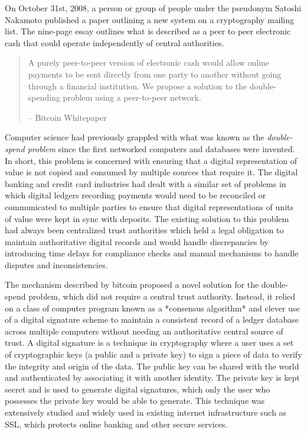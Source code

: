 On October 31st, 2008, a person or group of people under the pseudonym Satoshi
Nakamoto published \cite{nakamoto_bitcoin_2008} a paper outlining a new system on a
cryptography mailing list. The nine-page essay outlines what is described as a
peer to peer electronic cash that could operate independently of central
authorities.


\begin{quote}
A purely peer-to-peer version of electronic cash would allow online
payments to be sent directly from one party to another without going
through a financial institution. We propose a solution to the
double-spending problem using a peer-to-peer network.
\begin{flushright}
-- Bitcoin Whitepaper
\end{flushright}
\end{quote}

Computer science had previously grappled with what was known as the
\textit{double-spend problem} since the first networked computers and databases
were invented. In short, this problem is concerned with ensuring that a digital
representation of value is not copied and consumed by multiple sources that
require it. The digital banking and credit card industries had dealt with a
similar set of problems in which digital ledgers recording payments would need
to be reconciled or communicated to multiple parties to ensure that digital
representations of units of value were kept in sync with deposits. The existing
solution to this problem had always been centralized trust authorities which
held a legal obligation to maintain authoritative digital records and would
handle discrepancies by introducing time delays for compliance checks and manual
mechanisms to handle disputes and inconsistencies.


The mechanism described by bitcoin proposed a novel solution for the
double-spend problem, which did not require a central trust authority. Instead,
it relied on a class of computer program known as a *consensus algorithm* and
clever use of a digital signature scheme to maintain a consistent record of a
ledger database across multiple computers without needing an authoritative
central source of trust. A digital signature is a technique in cryptography
where a user uses a set of cryptographic keys (a public and a private key) to
sign a piece of data to verify the integrity and origin of the data. The public
key can be shared with the world and authenticated by associating it with
another identity. The private key is kept secret and is used to generate digital
signatures, which only the user who possesses the private key would be able to
generate. This technique was extensively studied and widely used in existing
internet infrastructure such as SSL, which protects online banking and other
secure services.

